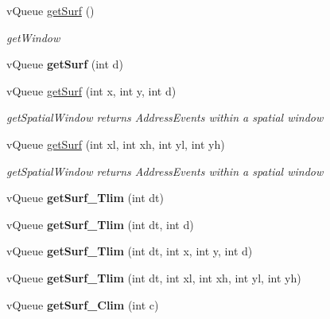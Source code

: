\begin{DoxyCompactItemize}
\item 
v\+Queue \hyperlink{classev_1_1vSurface2_aedcc28d0ccdbc343f031506a8fa84bb0}{get\+Surf} ()
\begin{DoxyCompactList}\small\item\em get\+Window \end{DoxyCompactList}\item 
v\+Queue {\bfseries get\+Surf} (int d)\hypertarget{classev_1_1vSurface2_aaa5978b3d040e278db563495585adf86}{}\label{classev_1_1vSurface2_aaa5978b3d040e278db563495585adf86}

\item 
v\+Queue \hyperlink{classev_1_1vSurface2_a42f7a69a075225254ffddc7bb5d4d9ba}{get\+Surf} (int x, int y, int d)
\begin{DoxyCompactList}\small\item\em get\+Spatial\+Window returns Address\+Events within a spatial window \end{DoxyCompactList}\item 
v\+Queue \hyperlink{classev_1_1vSurface2_aa74adc0c56d62a6f51c2901ec209233e}{get\+Surf} (int xl, int xh, int yl, int yh)
\begin{DoxyCompactList}\small\item\em get\+Spatial\+Window returns Address\+Events within a spatial window \end{DoxyCompactList}\item 
v\+Queue {\bfseries get\+Surf\+\_\+\+Tlim} (int dt)\hypertarget{classev_1_1vSurface2_a70e292820956b12c3bc123c4e724e90a}{}\label{classev_1_1vSurface2_a70e292820956b12c3bc123c4e724e90a}

\item 
v\+Queue {\bfseries get\+Surf\+\_\+\+Tlim} (int dt, int d)\hypertarget{classev_1_1vSurface2_ad487a13d9bcd8433489fb7e7b3fa5dc8}{}\label{classev_1_1vSurface2_ad487a13d9bcd8433489fb7e7b3fa5dc8}

\item 
v\+Queue {\bfseries get\+Surf\+\_\+\+Tlim} (int dt, int x, int y, int d)\hypertarget{classev_1_1vSurface2_a53939fc4b201eaee766114982d0ae9c2}{}\label{classev_1_1vSurface2_a53939fc4b201eaee766114982d0ae9c2}

\item 
v\+Queue {\bfseries get\+Surf\+\_\+\+Tlim} (int dt, int xl, int xh, int yl, int yh)\hypertarget{classev_1_1vSurface2_a63c601ec2570dbde037c9ea92342b24b}{}\label{classev_1_1vSurface2_a63c601ec2570dbde037c9ea92342b24b}

\item 
v\+Queue {\bfseries get\+Surf\+\_\+\+Clim} (int c)\hypertarget{classev_1_1vSurface2_acb41c1eff67ff285be715f8504d37d22}{}\label{classev_1_1vSurface2_acb41c1eff67ff285be715f8504d37d22}


\end{DoxyCompactItemize}
